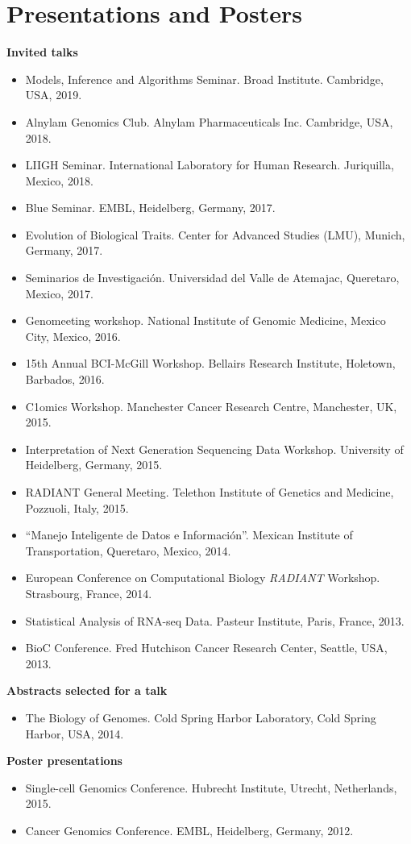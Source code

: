 \documentclass[11pt,a4paper,sans]{moderncv} %
\begin{document}
\section{Presentations and Posters}
\vspace{-.1cm}
\textbf{Invited talks}
\begin{itemize}
\item Models, Inference and Algorithms Seminar. Broad Institute. Cambridge, USA, 2019.
\item Alnylam Genomics Club. Alnylam Pharmaceuticals Inc. Cambridge, USA, 2018.
\item LIIGH Seminar. International Laboratory for Human Research.  Juriquilla, Mexico, 2018.
\item Blue Seminar. EMBL, Heidelberg, Germany, 2017. 
\item Evolution of Biological Traits. Center for Advanced Studies (LMU), Munich, Germany, 2017.
\item Seminarios de Investigaci\'on. Universidad del Valle de Atemajac, Queretaro, Mexico, 2017.
\item Genomeeting workshop. National Institute of Genomic Medicine, Mexico City, Mexico, 2016. 
\item 15th Annual BCI-McGill Workshop. Bellairs Research Institute, Holetown, Barbados, 2016.
\item C1omics Workshop. Manchester Cancer Research Centre, Manchester, UK, 2015.
\item Interpretation of Next Generation Sequencing Data
  Workshop. University of Heidelberg, Germany, 2015. 
\item RADIANT General Meeting. Telethon Institute of Genetics and Medicine, Pozzuoli, Italy, 2015.
\item ``Manejo Inteligente de Datos e Informaci\'on''. Mexican Institute of Transportation, Queretaro, Mexico, 2014.
\item European Conference on Computational Biology \emph{RADIANT} Workshop. Strasbourg, France, 2014.
\item Statistical Analysis of RNA-seq Data. Pasteur Institute, Paris, France, 2013.
\item BioC Conference. Fred Hutchison Cancer Research Center, Seattle, USA, 2013.
\end{itemize}
\vspace{.1cm}
\textbf{Abstracts selected for a talk}
\begin{itemize}
\item The Biology of Genomes. Cold Spring Harbor Laboratory, Cold Spring Harbor, USA, 2014. 
\end{itemize}
\vspace{.1cm}
\textbf{Poster presentations}
\begin{itemize}
\item Single-cell Genomics Conference. Hubrecht Institute, Utrecht, Netherlands, 2015.
\item Cancer Genomics Conference. EMBL, Heidelberg, Germany, 2012.
\end{itemize}
\end{document}
